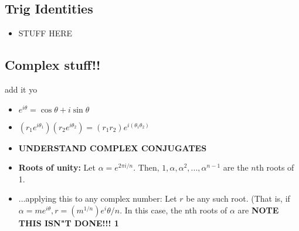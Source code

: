\documentclass[10pt,letterpaper]{article}
\begin{document}
\subsection*{Trig Identities}
\begin{itemize}
\item STUFF HERE 
\end{itemize}

\subsection*{Complex stuff!! }
add it yo 
\begin{itemize}
\item $e^{i\theta}=\cos\theta+i\sin\theta$
\item $(r_1e^{i\theta_1})(r_2e^{i\theta_2})=(r_1r_2)e^{i(\theta_1\theta_2)}$
\item \textbf{UNDERSTAND COMPLEX CONJUGATES }
\item \textbf{Roots of unity:} Let $\alpha = e^{2\pi i/n}. \mbox{ Then, } 1, \alpha, \alpha^2,...,\alpha^{n-1}$ 
are the $n$th roots of 1. 
\item ...applying this to any complex number: Let $r$ be any such root. (That is, if
$\alpha = me^{i\theta}, r=(m^{1/n})e^i\theta/n$. In this case, the nth roots of 
$\alpha$ are \textbf{NOTE THIS ISN"T DONE!!! 1}

\end{itemize}


\iffalse 
#### sources 
* http://inside.mines.edu/fs_home/gmurray/teach/s02/trialSoln.pdf

\fi 
\end{document}
